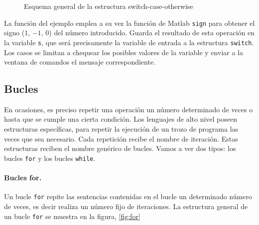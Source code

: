 \begin{figure}[h]
\centering
{}
\caption{Esquema general de la estructura switch-case-otherwise}
\label{fig:switch}
\end{figure}

La función del ejemplo emplea a su vez la función de Matlab \texttt{sign} para obtener el signo ($1$, $-1$, $0$) del número introducido. Guarda el resultado de esta operación en la variable \texttt{s}, que será precisamente la variable de entrada a la estructura \texttt{switch}. Los casos se limitan a chequear los posibles valores de la variable y enviar a la ventana de comandos el mensaje correspondiente.
 
\subsection{Bucles}
En ocasiones, es preciso repetir una operación un número determinado de veces o hasta que se cumple una cierta condición. Los lenguajes de alto nivel poseen estructuras específicas, para repetir la ejecución de un trozo de programa las veces que sea necesario. Cada repetición recibe el nombre de iteración. Estas estructuras reciben el nombre genérico de bucles. Vamos a ver dos tipos: los bucles \texttt{for} y los bucles \texttt{while}.

\paragraph{Bucles for.} Un bucle \texttt{for} repite las sentencias contenidas en el bucle un determinado número de veces, es decir realiza un número fijo de iteraciones. La estructura general de un bucle \texttt{for} se muestra en la figura, \ref{fig:for}


